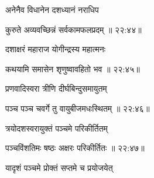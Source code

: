 {\devanagarifont अनेनैव विधानेन दशध्यानं नराधिप \thinspace{\dandab} \dontdisplaylinenum }%


{\devanagarifont कुरुते अव्यवच्छिन्नं सर्वकामफलप्रदम् {॥ २२:४४॥} \veg\dontdisplaylinenum }%


{\devanagarifont दशाक्षरं महाराज योगीन्द्रस्य महात्मनः \thinspace{\dandab} \dontdisplaylinenum }%


{\devanagarifont कथयामि समासेन शृणुष्वावहितो भव {॥ २२:४५॥} \veg\dontdisplaylinenum }%
 
{\devanagarifont प्रणवादिस्वरा त्रीणि दीर्घबिन्दुसमायुतम् \thinspace{\dandab} \dontdisplaylinenum }%


{\devanagarifont पञ्च पञ्च चवर्गे तु वायुबीजमधःस्थितम् {॥ २२:४६॥} \veg\dontdisplaylinenum }%

{\devanagarifont त्रयोदशस्वरायुक्तं पञ्चमे परिकीर्तितम् \thinspace{\dandab} \dontdisplaylinenum }%


{\devanagarifont पञ्चविंशतिमः षष्ठः अक्षरः परिकीर्तितः {॥ २२:४७॥} \veg\dontdisplaylinenum }%

{\devanagarifont यादृशं पञ्चमे प्रोक्तं सप्तमे च प्रयोजयेत् \thinspace{\dandab} \dontdisplaylinenum }%


